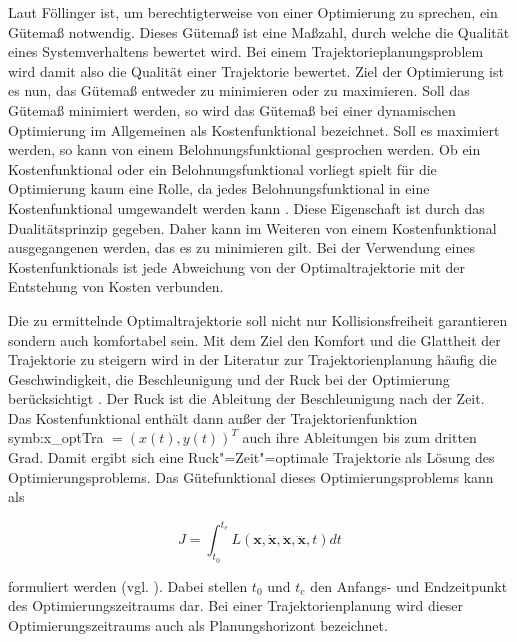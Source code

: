 Laut F\"ollinger \cite{Follinger1988} ist, um berechtigterweise von einer Optimierung zu sprechen, ein G\"utema{\ss} notwendig. 
Dieses G\"utema{\ss} ist eine Ma{\ss}zahl, durch welche die Qualit\"at eines Systemverhaltens bewertet wird.
Bei einem Trajektorieplanungsproblem wird damit also die Qualit\"at einer Trajektorie bewertet.
Ziel der Optimierung ist es nun, das G\"utema{\ss} entweder zu minimieren oder zu maximieren. 
Soll das G\"utema{\ss} minimiert werden, so wird das G\"utema{\ss} bei einer dynamischen Optimierung im Allgemeinen als Kostenfunktional bezeichnet.
Soll es maximiert werden, so kann von einem Belohnungsfunktional gesprochen werden.
Ob ein Kostenfunktional oder ein Belohnungsfunktional vorliegt spielt f\"ur die Optimierung kaum eine Rolle, da jedes Belohnungsfunktional in eine Kostenfunktional umgewandelt werden kann \cite{Graichen2012}.
Diese Eigenschaft ist durch das Dualit\"atsprinzip gegeben.
Daher kann im Weiteren von einem Kostenfunktional ausgegangenen werden, das es zu minimieren gilt.
Bei der Verwendung eines Kostenfunktionals ist jede Abweichung von der Optimaltrajektorie mit der Entstehung von Kosten verbunden.

Die zu ermittelnde Optimaltrajektorie soll nicht nur Kollisionsfreiheit garantieren sondern auch komfortabel sein.
Mit dem Ziel den Komfort und die Glattheit der Trajektorie zu steigern wird in der Literatur zur Trajektorienplanung h\"aufig die Geschwindigkeit, die Beschleunigung und der Ruck bei der Optimierung ber\"ucksichtigt \cite{Ziegler2017} \cite{Werling2011}.
Der Ruck ist die Ableitung der Beschleunigung nach der Zeit.
Das Kostenfunktional enth\"alt dann au{\ss}er der Trajektorienfunktion \gls{symb:x_optTra} \(=(x(t), y(t))^T \) auch ihre Ableitungen bis zum dritten Grad.
Damit ergibt sich eine Ruck"=Zeit"=optimale Trajektorie als L\"osung des Optimierungsproblems.
Das G\"utefunktional dieses Optimierungsproblems kann als

\begin{equation} 
  J = \int_{t_0}^{t_e} L( \pmb{x}, \pmb{\dot{x}}, \pmb{\ddot{x}}, \pmb{\dddot{x}}, t) dt
  \label{eq:Kostenfunktional}
\end{equation} 

formuliert werden (vgl. \cite{Ziegler2017}). Dabei stellen \( t_0\) und \( t_e\) den Anfangs- und Endzeitpunkt des Optimierungszeitraums dar.
Bei einer Trajektorienplanung wird dieser Optimierungszeitraums auch als Planungshorizont bezeichnet.

